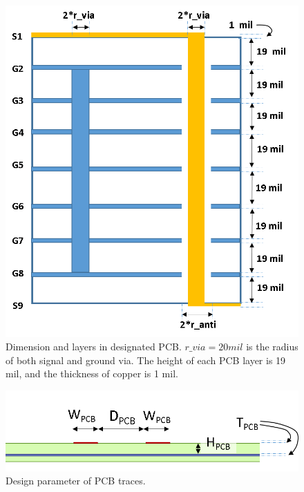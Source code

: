 \documentclass{book}  %
\begin{document}
\begin{paper}
\begin{figure}[htbp!]
	\centering
	\includegraphics[width=0.8\columnwidth]{./img/PCB/PCB_layer_dimension.png}
	\caption{Dimension and layers in designated PCB. $r\_via=20 mil$ is the radius of both signal and ground via. The height of each PCB layer is 19 mil, and the thickness of copper is 1 mil. }
	\label{fig:pcb_layers} %
\end{figure}

\begin{figure}[htbp!]
	\centering
	\includegraphics[width=0.8\columnwidth]{./img/PCB/differential_PCB_2D_CrossSection.png}
	\caption{Design parameter of PCB traces.}
	\label{fig:pcb_trace} %
\end{figure}


\end{paper}
\end{document}
